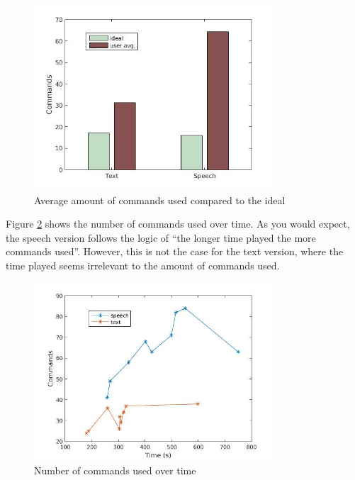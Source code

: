 \begin{figure}[h!]
  \centering
  \includegraphics[width=0.8\textwidth]{images/ideal_cmd.jpg}
  \caption{Average amount of commands used compared to the ideal}\label{ideal_cmd}
\end{figure}

Figure \ref{time_cmd} shows the number of commands used over time. As you would expect, the speech version follows the logic of ``the longer time played the more commands used''. However, this is not the case for the text version, where the time played seems irrelevant to the amount of commands used.

\begin{figure}[h!]
  \centering
  \includegraphics[width=0.8\textwidth]{images/time_cmd.jpg} %
  \caption{Number of commands used over time}\label{time_cmd}
\end{figure}

